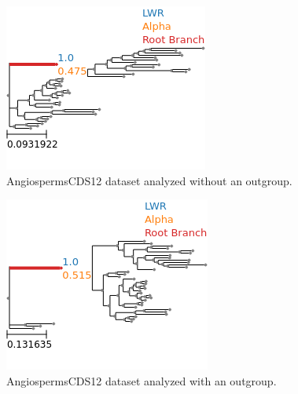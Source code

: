 \documentclass{article}
\begin{document}
\begin{figure}
  \begin{center}
    \includegraphics[width=.5\linewidth]{figs/angio/cds12_no_outgroup.png}
    \caption{AngiospermsCDS12 dataset analyzed without an outgroup.}
    \label{fig:angio-cds12-no-outgroup}
  \end{center}
\end{figure}

\begin{figure}
  \begin{center}
    \includegraphics[width=.5\linewidth]{./figs/angio/cds12_with_outgroup.png}
    \caption{AngiospermsCDS12 dataset analyzed with an outgroup.}
    \label{fig:angio-cds12-outgroup}
  \end{center}
\end{figure}
\end{document}
